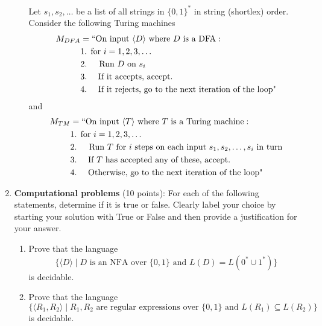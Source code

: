 \begin{enumerate}[wide, labelwidth=!, labelindent=0pt]
\begin{enumerate}
    Let $s_1, s_2, \ldots$ be a list of all strings in 
    $\{0,1\}^*$ in string (shortlex) order. Consider the following Turing machines
    \begin{align*}
        M_{DFA} &= ``\text{On input $\langle D \rangle$ where $D$ is a DFA}:\\
         &\text{1. for $i=1, 2, 3, \ldots$} \\
         &\text{2.~~~ Run $D$ on $s_i$} \\
         &\text{3.~~~~If it accepts, accept.}\\
         &\text{4.~~~~If it rejects, go to the next iteration of the loop"}\\
     \end{align*}
     and
     \begin{align*}
        M_{TM} &= ``\text{On input $\langle T \rangle$ where $T$ is a Turing machine}:\\
         &\text{1. for $i=1, 2, 3, \ldots$} \\
         &\text{2.~~~ Run $T$ for $i$ steps on each input $s_1, s_2, \ldots, s_i$ in turn} \\
         &\text{3.~~~~If $T$ has accepted any of these, accept.}\\
         &\text{4.~~~~Otherwise, go to the next iteration of the loop"}\\
     \end{align*}
\end{enumerate}


\item\textbf{Computational problems} (10 points):
For each of the following statements, determine if it is true or false. 
Clearly label your choice by starting your solution with True or False and then provide a 
 justification for your answer.

\begin{enumerate}
    \item\gradeCorrect Prove that the language $$\{\langle D \rangle \mid D \text{ is an NFA over $\{0,1\}$ and } L(D) = L(0^*\cup 1^*) \}$$
    is decidable.
    \item\gradeCorrect Prove that the language $$\{\langle R_1, R_2 \rangle \mid R_1, R_2 \text{ are regular expressions over $\{0,1\}$ and } L(R_1) \subseteq L(R_2) \}$$ is decidable.
\end{enumerate}

\end{enumerate}
